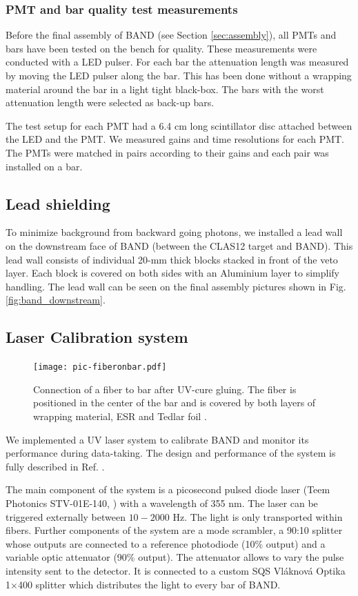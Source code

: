 \documentclass[3p,final,twocolumn]{elsarticle}
\begin{document}
\subsubsection{PMT and bar quality test measurements}
Before the final assembly of BAND (see Section \ref{sec:assembly}), all PMTs and bars have been tested on the bench for quality. These measurements were conducted with a LED pulser.
For each bar the attenuation length was measured by moving the LED pulser along the bar. This has been done without a wrapping material around the bar in a light tight black-box. The bars with the worst attenuation length were selected as back-up bars.

The test setup for each PMT had a 6.4 \si{\centi\meter} long scintillator disc attached between the LED and the PMT. We measured gains and time resolutions for each PMT. The PMTs were matched in pairs according to their gains and each pair was installed on a bar.


\subsection{Lead shielding}
To minimize background from backward going photons, we installed a
lead wall on the downstream face of BAND (between the CLAS12 target
and BAND). This lead wall consists of individual 20-\si{\milli\meter}
thick blocks stacked in front of the veto layer. Each block is covered
on both sides with an Aluminium layer to simplify handling. The
lead wall can be seen on the final assembly pictures shown in
Fig. \ref{fig:band_downstream}.


\subsection{Laser Calibration system}
\label{sec:laserystem}
\begin{figure}[tb]
	\centering
		\texttt{[image: pic-fiberonbar.pdf]}
	\caption{Connection of a fiber to bar after UV-cure gluing. The fiber is positioned in the center of the bar and is covered by both layers of wrapping material, ESR \cite{3MESR} and Tedlar foil \cite{tedlarfoil}.}
	\label{fig:pic-fiberonbar}
\end{figure}
We implemented a UV laser system to calibrate BAND and monitor its
performance during data-taking. The design and performance of the
system is fully described in Ref. \cite{band-laser}. 

The main component of the system is a picosecond pulsed diode laser (Teem Photonics STV-01E-140, \cite{teem_laser}) with a wavelength of 355 \si{\nano\meter}. The laser can be triggered externally between $10-2000$ \si{\hertz}. The light is only transported within fibers. Further components of the system are a mode scrambler, a 90:10 splitter whose outputs are connected to a reference photodiode (10\% output) and a variable optic attenuator \cite{attenuator} (90\% output). The attenuator allows to vary the pulse intensity sent to the detector. It is connected to a custom SQS Vl\'aknov\'a Optika 1$\times$400 splitter which distributes the light to every bar of BAND. 
\end{document}
